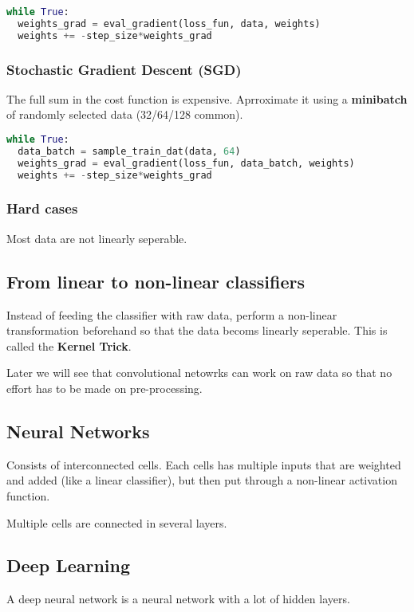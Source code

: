 \documentclass[a4paper, fontsize=8pt, landscape, DIV=1]{scrartcl}
\begin{document}
\begin{multicols*}{4}
  \begin{lstlisting}[language=Python]
while True:
  weights_grad = eval_gradient(loss_fun, data, weights)
  weights += -step_size*weights_grad\end{lstlisting}

  \subsubsection{Stochastic Gradient Descent (SGD)}
  The full sum in the cost function is expensive. Aprroximate it using a \textbf{minibatch}
  of randomly selected data (32/64/128 common).
  \begin{lstlisting}[language=Python]
while True:
  data_batch = sample_train_dat(data, 64)
  weights_grad = eval_gradient(loss_fun, data_batch, weights)
  weights += -step_size*weights_grad\end{lstlisting}

  \subsubsection{Hard cases}
  Most data are not linearly seperable.

  \subsection{From linear to non-linear classifiers}
  Instead of feeding the classifier with raw data, perform a non-linear transformation
  beforehand so that the data becoms linearly seperable. This is called the \textbf{Kernel Trick}.
  
  Later we will see that convolutional netowrks can work on raw data so that no
  effort has to be made on pre-processing.

  \subsection{Neural Networks}
  Consists of interconnected cells. Each cells has multiple inputs that are weighted
  and added (like a linear classifier), but then put through a non-linear activation
  function.

  Multiple cells are connected in several layers.

  \subsection{Deep Learning}
  A deep neural network is a neural network with a lot of hidden layers.


\end{multicols*}
\end{document}
